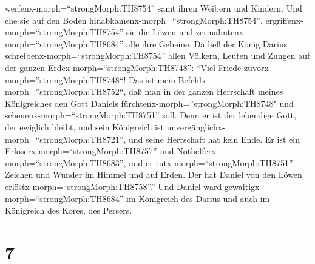 werfenx-morph=``strongMorph:TH8754'' samt ihren Weibern und Kindern. Und
ehe sie auf den Boden hinabkamenx-morph=``strongMorph:TH8754'',
ergriffenx-morph=``strongMorph:TH8754'' sie die Löwen und
zermalmtenx-morph=``strongMorph:TH8684'' alle ihre Gebeine.
 Da ließ der König Darius
schreibenx-morph=``strongMorph:TH8754'' allen Völkern, Leuten und Zungen
auf der ganzen Erdex-morph=``strongMorph:TH8748'': ``Viel Friede
zuvorx-morph=''strongMorph:TH8748``!  Das ist mein
Befehlx-morph=''strongMorph:TH8752``, daß man in der ganzen Herrschaft
meines Königreiches den Gott Daniels
fürchtenx-morph=''strongMorph:TH8748" und
scheuenx-morph=``strongMorph:TH8751'' soll. Denn er ist der lebendige
Gott, der ewiglich bleibt, und sein Königreich ist
unvergänglichx-morph=``strongMorph:TH8721'', und seine Herrschaft hat
kein Ende.  Er ist ein
Erlöserx-morph=``strongMorph:TH8757'' und
Nothelferx-morph=``strongMorph:TH8683'', und er
tutx-morph=``strongMorph:TH8751'' Zeichen und Wunder im Himmel und auf
Erden. Der hat Daniel von den Löwen
erlöstx-morph=``strongMorph:TH8758''.''  Und Daniel ward
gewaltigx-morph=``strongMorph:TH8684'' im Königreich des Darius und auch
im Königreich des Kores, des Persers.

\hypertarget{section-6}{%
\section{7}\label{section-6}}

